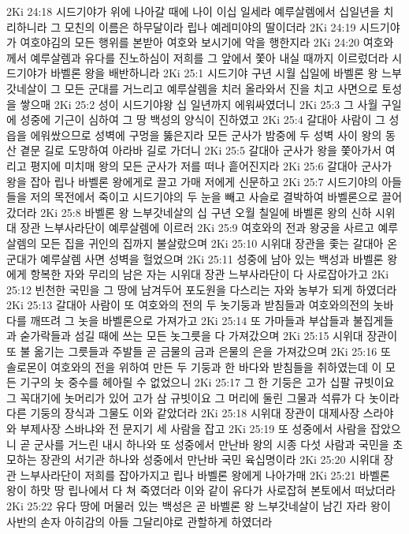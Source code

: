 2Ki 24:18  시드기야가 위에 나아갈 때에 나이 이십 일세라 예루살렘에서 십일년을 치리하니라 그 모친의 이름은 하무달이라 립나 예레미야의 딸이더라
2Ki 24:19  시드기야가 여호야김의 모든 행위를 본받아 여호와 보시기에 악을 행한지라
2Ki 24:20  여호와께서 예루살렘과 유다를 진노하심이 저희를 그 앞에서 쫓아 내실 때까지 이르렀더라 시드기야가 바벨론 왕을 배반하니라
2Ki 25:1  시드기야 구년 시월 십일에 바벨론 왕 느부갓네살이 그 모든 군대를 거느리고 예루살렘을 치러 올라와서 진을 치고 사면으로 토성을 쌓으매
2Ki 25:2  성이 시드기야왕 십 일년까지 에워싸였더니
2Ki 25:3  그 사월 구일에 성중에 기근이 심하여 그 땅 백성의 양식이 진하였고
2Ki 25:4  갈대아 사람이 그 성읍을 에워쌌으므로 성벽에 구멍을 뚫은지라 모든 군사가 밤중에 두 성벽 사이 왕의 동산 곁문 길로 도망하여 아라바 길로 가더니
2Ki 25:5  갈대아 군사가 왕을 쫓아가서 여리고 평지에 미치매 왕의 모든 군사가 저를 떠나 흩어진지라
2Ki 25:6  갈대아 군사가 왕을 잡아 립나 바벨론 왕에게로 끌고 가매 저에게 신문하고
2Ki 25:7  시드기야의 아들들을 저의 목전에서 죽이고 시드기야의 두 눈을 빼고 사슬로 결박하여 바벨론으로 끌어갔더라
2Ki 25:8  바벨론 왕 느부갓네살의 십 구년 오월 칠일에 바벨론 왕의 신하 시위대 장관 느부사라단이 예루살렘에 이르러
2Ki 25:9  여호와의 전과 왕궁을 사르고 예루살렘의 모든 집을 귀인의 집까지 불살랐으며
2Ki 25:10  시위대 장관을 좇는 갈대아 온 군대가 예루살렘 사면 성벽을 헐었으며
2Ki 25:11  성중에 남아 있는 백성과 바벨론 왕에게 항복한 자와 무리의 남은 자는 시위대 장관 느부사라단이 다 사로잡아가고
2Ki 25:12  빈천한 국민을 그 땅에 남겨두어 포도원을 다스리는 자와 농부가 되게 하였더라
2Ki 25:13  갈대아 사람이 또 여호와의 전의 두 놋기둥과 받침들과 여호와의전의 놋바다를 깨뜨려 그 놋을 바벨론으로 가져가고
2Ki 25:14  또 가마들과 부삽들과 불집게들과 숟가락들과 섬길 때에 쓰는 모든 놋그릇을 다 가져갔으며
2Ki 25:15  시위대 장관이 또 불 옮기는 그릇들과 주발들 곧 금물의 금과 은물의 은을 가져갔으며
2Ki 25:16  또 솔로몬이 여호와의 전을 위하여 만든 두 기둥과 한 바다와 받침들을 취하였는데 이 모든 기구의 놋 중수를 헤아릴 수 없었으니
2Ki 25:17  그 한 기둥은 고가 십팔 규빗이요 그 꼭대기에 놋머리가 있어 고가 삼 규빗이요 그 머리에 둘린 그물과 석류가 다 놋이라 다른 기둥의 장식과 그물도 이와 같았더라
2Ki 25:18  시위대 장관이 대제사장 스라야와 부제사장 스바냐와 전 문지기 세 사람을 잡고
2Ki 25:19  또 성중에서 사람을 잡았으니 곧 군사를 거느린 내시 하나와 또 성중에서 만난바 왕의 시종 다섯 사람과 국민을 초모하는 장관의 서기관 하나와 성중에서 만난바 국민 육십명이라
2Ki 25:20  시위대 장관 느부사라단이 저희를 잡아가지고 립나 바벨론 왕에게 나아가매
2Ki 25:21  바벨론 왕이 하맛 땅 립나에서 다 쳐 죽였더라 이와 같이 유다가 사로잡혀 본토에서 떠났더라
2Ki 25:22  유다 땅에 머물러 있는 백성은 곧 바벨론 왕 느부갓네살이 남긴 자라 왕이 사반의 손자 아히감의 아들 그달리야로 관할하게 하였더라
